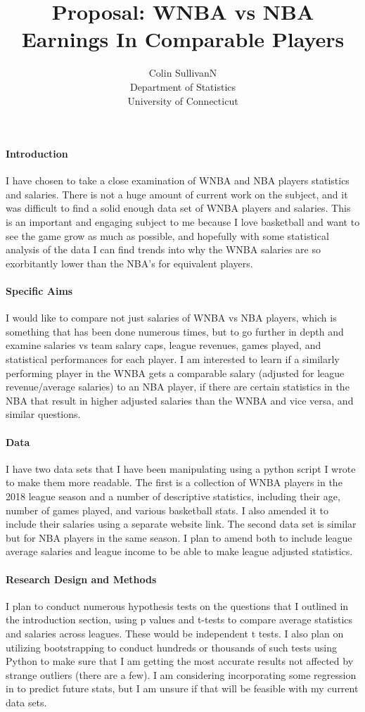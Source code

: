 \documentclass[12pt]{article}
\title{Proposal: WNBA vs NBA Earnings In Comparable Players}
\author{Colin SullivanN\\
  Department of Statistics\\
  University of Connecticut
}
\begin{document}
\maketitle


\paragraph{Introduction}
I have chosen to take a close examination of WNBA and NBA players statistics and salaries. There is not a huge amount of current work on the subject, and it was difficult to find a solid enough data set of WNBA players and salaries. This is an important and engaging subject to me because I love basketball and want to see the game grow as much as possible, and hopefully with some statistical analysis of the data I can find trends into why the WNBA salaries are so exorbitantly lower than the NBA's for equivalent players.

\paragraph{Specific Aims}
I would like to compare not just salaries of WNBA vs NBA players, which is something that has been done numerous times, but to go further in depth and examine salaries vs team salary caps, league revenues, games played, and statistical performances for each player. I am interested to learn if a similarly performing player in the WNBA gets a comparable salary (adjusted for league revenue/average salaries) to an NBA player, if there are certain statistics in the NBA that result in higher adjusted salaries than the WNBA and vice versa, and similar questions.

\paragraph{Data}
I have two data sets that I have been manipulating using a python script I wrote to make them more readable. The first is a collection of WNBA players in the 2018 league season and a number of descriptive statistics, including their age, number of games played, and various basketball stats. I also amended it to include their salaries using a separate website link. The second data set is similar but for NBA players in the same season. I plan to amend both to include league average salaries and league income to be able to make league adjusted statistics.

\paragraph{Research Design and Methods}
I plan to conduct numerous hypothesis tests on the questions that I outlined in the introduction section, using p values and t-tests to compare average statistics and salaries across leagues. These would be independent t tests. I also plan on utilizing bootstrapping to conduct hundreds or thousands of such tests using Python to make sure that I am getting the most accurate results not affected by strange outliers (there are a few). I am considering incorporating some regression in to predict future stats, but I am unsure if that will be feasible with my current data sets.
\end{document}

